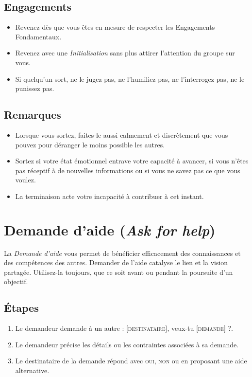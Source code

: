 \documentclass[paper=6in:9in,pagesize=pdftex,headinclude=on,footinclude=on,11pt]{scrbook}
\let\oldsection\section
\renewcommand\section{\clearpage\oldsection}
\begin{document}
\subsection{Engagements}
\begin{itemize}
	\item Revenez dès que vous êtes en mesure de respecter les Engagements Fondamentaux.
	\item Revenez avec une \emph{Initialisation} sans plus attirer l'attention du groupe sur vous.
	\item Si quelqu'un sort, ne le jugez pas, ne l'humiliez pas, ne l'interrogez pas, ne le punissez pas.
\end{itemize}

\subsection{Remarques}
\begin{itemize}
	\item Lorsque vous sortez, faites-le aussi calmement et discrètement que vous pouvez pour déranger le moins possible les autres.
	\item Sortez si votre état émotionnel entrave votre capacité à avancer, si vous n'êtes pas réceptif à de nouvelles informations ou
	      si vous ne savez pas ce que vous voulez.
	\item La terminaison acte votre incapacité à contribuer à cet instant.
\end{itemize}

\section{Demande d'aide (\emph{Ask for help})} \label{demande-aide}

La \emph{Demande d'aide} vous permet de bénéficier efficacement des connaissances et des compétences des autres. Demander de l'aide
catalyse le lien et la vision partagée. Utilisez-la toujours, que ce soit avant ou pendant la poursuite d'un objectif.

\subsection{Étapes}
\begin{enumerate}
	\item Le demandeur demande à un autre : \og{}[\textsc{destinataire}], veux-tu [\textsc{demande}] ?\fg{}.
	\item Le demandeur précise les détails ou les contraintes associées à sa demande.
	\item Le destinataire de la demande répond avec \textsc{oui}, \textsc{non} ou en proposant une aide alternative.
\end{enumerate}
\end{document}
